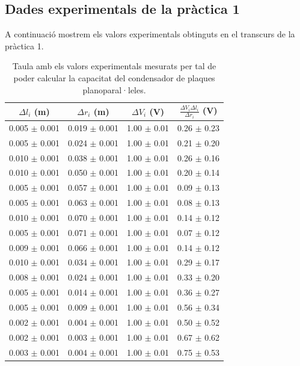 \documentclass[a4paper,10.5pt]{report}
\begin{document}
\begin{appendices}
\subsection{Dades experimentals de la pràctica 1}
\label{an:a2}
A continuació mostrem els valors experimentals obtinguts en el transcurs de la pràctica 1.
\begin{table}[h]
	\centering
	\renewcommand{\arraystretch}{1.2}
	\caption{Taula amb els valors experimentals mesurats per tal de poder calcular la capacitat del condensador de plaques planoparal·leles.}
	\begin{tabular}{cccc}
		\toprule
		$\Delta l_i$ (m) & $\Delta r_i$ (m) & $\Delta V_i$ (V) & $\frac{\Delta V_i\Delta l_i}{\Delta r_i}$ (V)\\
		\midrule
		0.005 $\pm$ 0.001 & 0.019 $\pm$ 0.001 & 1.00 $\pm$ 0.01 & 0.26 $\pm$ 0.23 \\
		0.005 $\pm$ 0.001 & 0.024 $\pm$ 0.001 & 1.00 $\pm$ 0.01 & 0.21 $\pm$ 0.20 \\
		0.010 $\pm$ 0.001 & 0.038 $\pm$ 0.001 & 1.00 $\pm$ 0.01 & 0.26 $\pm$ 0.16 \\
		0.010 $\pm$ 0.001 & 0.050 $\pm$ 0.001 & 1.00 $\pm$ 0.01 & 0.20 $\pm$ 0.14 \\
		0.005 $\pm$ 0.001 & 0.057 $\pm$ 0.001 & 1.00 $\pm$ 0.01 & 0.09 $\pm$ 0.13 \\
		0.005 $\pm$ 0.001 & 0.063 $\pm$ 0.001 & 1.00 $\pm$ 0.01 & 0.08 $\pm$ 0.13 \\
		0.010 $\pm$ 0.001 & 0.070 $\pm$ 0.001 & 1.00 $\pm$ 0.01 & 0.14 $\pm$ 0.12 \\
		0.005 $\pm$ 0.001 & 0.071 $\pm$ 0.001 & 1.00 $\pm$ 0.01 & 0.07 $\pm$ 0.12 \\
		0.009 $\pm$ 0.001 & 0.066 $\pm$ 0.001 & 1.00 $\pm$ 0.01 & 0.14 $\pm$ 0.12 \\
		0.010 $\pm$ 0.001 & 0.034 $\pm$ 0.001 & 1.00 $\pm$ 0.01 & 0.29 $\pm$ 0.17 \\
		0.008 $\pm$ 0.001 & 0.024 $\pm$ 0.001 & 1.00 $\pm$ 0.01 & 0.33 $\pm$ 0.20 \\
		0.005 $\pm$ 0.001 & 0.014 $\pm$ 0.001 & 1.00 $\pm$ 0.01 & 0.36 $\pm$ 0.27 \\
		0.005 $\pm$ 0.001 & 0.009 $\pm$ 0.001 & 1.00 $\pm$ 0.01 & 0.56 $\pm$ 0.34 \\
		0.002 $\pm$ 0.001 & 0.004 $\pm$ 0.001 & 1.00 $\pm$ 0.01 & 0.50 $\pm$ 0.52 \\
		0.002 $\pm$ 0.001 & 0.003 $\pm$ 0.001 & 1.00 $\pm$ 0.01 & 0.67 $\pm$ 0.62 \\
		0.003 $\pm$ 0.001 & 0.004 $\pm$ 0.001 & 1.00 $\pm$ 0.01 & 0.75 $\pm$ 0.53 \\

\end{tabular}
\end{table}
\end{appendices}
\end{document}
